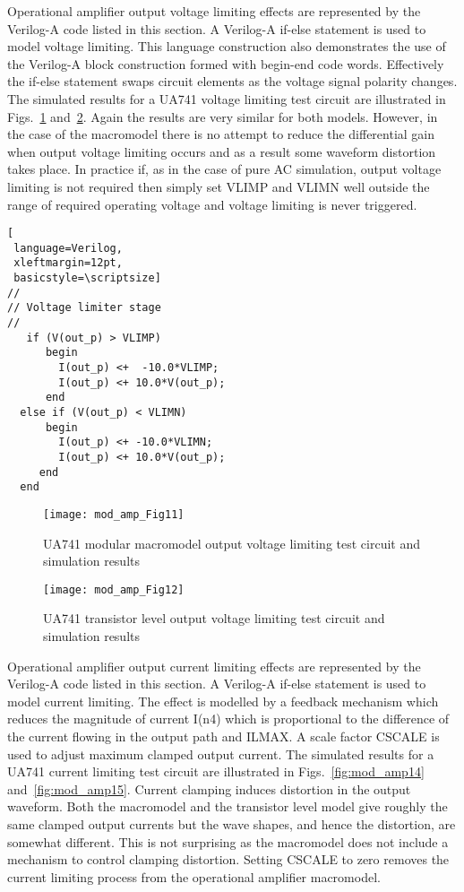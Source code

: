 Operational amplifier output voltage limiting effects are represented
by the Verilog-A code listed in this section. A Verilog-A if-else
statement is used to model voltage limiting.  This language
construction also demonstrates the use of the Verilog-A block
construction formed with begin-end code words.  Effectively the
if-else statement swaps circuit elements as the voltage signal
polarity changes.  The simulated results for a UA741 voltage limiting
test circuit are illustrated in Figs.~\ref{fig:mod_amp11}
and~\ref{fig:mod_amp12}. Again the results are very similar for both
models. However, in the case of the macromodel there is no attempt to
reduce the differential gain when output voltage limiting occurs and
as a result some waveform distortion takes place.  In practice if, as
in the case of pure AC simulation, output voltage limiting is not
required then simply set VLIMP and VLIMN well outside the range of
required operating voltage and voltage limiting is never triggered.

\begin{lstlisting}[
 language=Verilog, 
 xleftmargin=12pt,
 basicstyle=\scriptsize]
//
// Voltage limiter stage
//
   if (V(out_p) > VLIMP)
      begin
        I(out_p) <+  -10.0*VLIMP;
        I(out_p) <+ 10.0*V(out_p);
      end
  else if (V(out_p) < VLIMN)
      begin
        I(out_p) <+ -10.0*VLIMN;
        I(out_p) <+ 10.0*V(out_p);
     end
  end
\end{lstlisting}

\begin{figure} [here]
  \centering
  \texttt{[image: mod\_amp\_Fig11]}
  \caption{UA741 modular macromodel output voltage limiting test circuit and simulation results}
  \label{fig:mod_amp11}
\end{figure} 


\begin{figure} [here]
  \centering
  \texttt{[image: mod\_amp\_Fig12]}
  \caption{UA741 transistor level output voltage limiting test circuit and simulation results}
  \label{fig:mod_amp12}
\end{figure} 


Operational amplifier output current limiting effects are represented
by the Verilog-A code listed in this section. A Verilog-A if-else
statement is used to model current limiting.  The effect is modelled
by a feedback mechanism which reduces the magnitude of current I(n4)
which is proportional to the difference of the current flowing in the
output path and ILMAX.  A scale factor CSCALE is used to adjust
maximum clamped output current.  The simulated results for a UA741
current limiting test circuit are illustrated in
Figs.~\ref{fig:mod_amp14} and~\ref{fig:mod_amp15}. Current clamping
induces distortion in the output waveform. Both the macromodel and the
transistor level model give roughly the same clamped output currents
but the wave shapes, and hence the distortion, are somewhat different.
This is not surprising as the macromodel does not include a mechanism
to control clamping distortion. Setting CSCALE to zero removes the
current limiting process from the operational amplifier macromodel.

